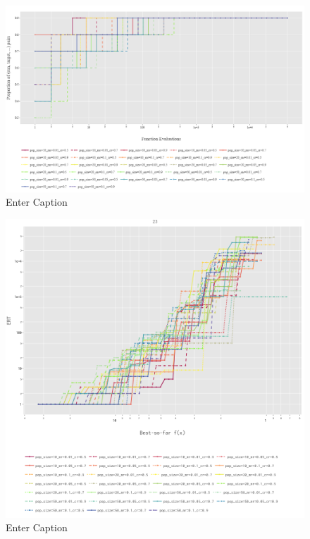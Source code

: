 \documentclass{article}
\begin{document}
\begin{figure}[h!]
    \centering
    \includegraphics[width=1\linewidth]{Graphs/Katsuura/Empirical_Cumulative_Distribution.png}
    \caption{Enter Caption}
    \label{fig:enter-label}
\end{figure}
\begin{figure}[h!]
    \centering
    \includegraphics[width=1\linewidth]{Graphs/Katsuura/Expected_RunTime_Multi.png}
    \caption{Enter Caption}
    \label{fig:enter-label}
\end{figure}
\end{document}
